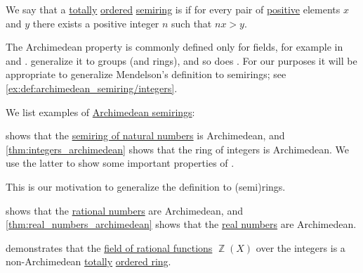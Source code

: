 \begin{definition}\label{def:archimedean_semiring}\mimprovised
  We say that a \hyperref[def:totally_ordered_set]{totally} \hyperref[def:ordered_semiring]{ordered} \hyperref[def:semiring]{semiring} is  if for every pair of \hyperref[def:ordered_semiring_positivity]{positive} elements \( x \) and \( y \) there exists a positive integer \( n \) such that \( nx > y \).
\end{definition}
\begin{comments}
  \item The Archimedean property is commonly defined only for fields, for example in \cite[192]{Mendelson2008NumberSystems} and \cite[450]{Lang2002Algebra}. \textcite[A.VI.35]{Bourbaki2003Algebra4to7} generalize it to groups (and rings), and so does \textcite[\S VI.3]{Курош1973ОбщаяАлгебра}. For our purposes it will be appropriate to generalize Mendelson's definition to semirings; see \cref{ex:def:archimedean_semiring/integers}.
\end{comments}

\begin{example}\label{ex:def:archimedean_semiring}
  We list examples of \hyperref[def:archimedean_semiring]{Archimedean semirings}:
  \begin{thmenum}
      shows that the \hyperref[def:natural_numbers]{semiring of natural numbers} is Archimedean, and \cref{thm:integers_archimedean} shows that the ring of integers is Archimedean. We use the latter to show some important properties of .

    This is our motivation to generalize the definition to (semi)rings.

      shows that the \hyperref[def:rational_numbers]{rational numbers} are Archimedean, and \cref{thm:real_numbers_archimedean} shows that the \hyperref[def:real_numbers]{real numbers} are Archimedean.

      demonstrates that the \hyperref[def:rational_function_field]{field of rational functions} \( \BbbZ(X) \) over the integers is a non-Archimedean \hyperref[def:totally_ordered_set]{totally} \hyperref[def:ordered_semiring]{ordered ring}.
  \end{thmenum}
\end{example}

